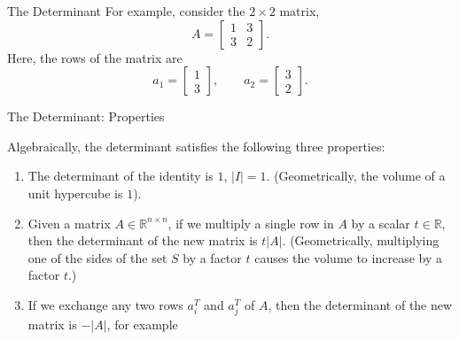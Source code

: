 \documentclass[aspectratio=169,12pt]{beamer}
\begin{document}
\begin{frame}[t]{The Determinant}
  \vspace{0.52cm}
  {\large
  For example, consider the $2\times2$ matrix,
  \begin{equation}
    A=\begin{bmatrix}1&3\\3&2\end{bmatrix}.
    \tag{3}
  \end{equation}
  Here, the rows of the matrix are
  \[
    a_1=\begin{bmatrix}1\\3\end{bmatrix},\qquad
    a_2=\begin{bmatrix}3\\2\end{bmatrix}.
  \]
  }
\end{frame}

\begin{frame}[t]{The Determinant: Properties}
  \vspace{-0.02cm}
  {\scriptsize
  Algebraically, the determinant satisfies the following three properties:
  \begin{enumerate}
    \setlength{\itemsep}{0.22cm}
    \item The determinant of the identity is $1$, $|I|=1$. (Geometrically, the
          volume of a unit hypercube is $1$).
    \item Given a matrix $A\in\mathbb{R}^{n\times n}$, if we multiply a single row
          in $A$ by a scalar $t\in\mathbb{R}$, then the determinant of the new
          matrix is $t|A|$. (Geometrically, multiplying one of the sides of the set
          $S$ by a factor $t$ causes the volume to increase by a factor $t$.)
    \item If we exchange any two rows $a_i^T$ and $a_j^T$ of $A$, then the
          determinant of the new matrix is $-|A|$, for example
  \end{enumerate}
  }
\end{frame}
\end{document}
